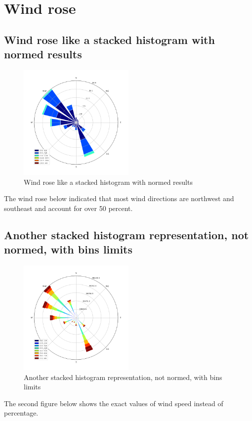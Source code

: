\documentclass[10pt]{report}
\begin{document}
\section{Wind rose}
 \subsection{Wind rose like a stacked histogram with normed results}
 \begin{figure}[h!]
    \centering
    \includegraphics[width=0.50\textwidth]{images/figure2.png}
    \caption{Wind rose like a stacked histogram with normed results}
    \label{fig: PaleBlueDot}    
\end{figure}
The wind rose below indicated that most wind directions are northwest and southeast and account for over 50 percent.

 \subsection{Another stacked histogram representation, not normed, with bins limits}
 \begin{figure}[h!]
    \centering
    \includegraphics[width=0.50\textwidth]{images/figure3.png}
    \caption{Another stacked histogram representation, not normed, with bins limits}
    \label{fig: PaleBlueDot}    
\end{figure}
The second figure below shows the exact values of wind speed instead of percentage.
\end{document}
